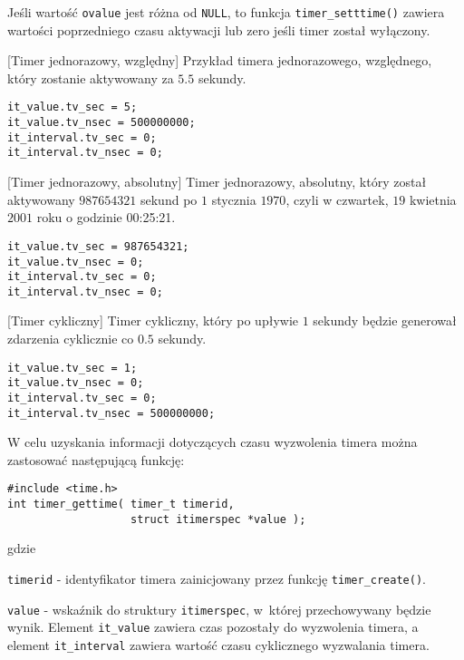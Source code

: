 Jeśli wartość \lstinline[style=MyCStyle]{ovalue} jest różna od \lstinline[style=MyCStyle]{NULL}, to funkcja \lstinline[style=MyCStyle]{timer_setttime()} zawiera wartości poprzedniego czasu aktywacji lub zero jeśli timer został wyłączony. 

\begin{example}{[Timer jednorazowy, względny]}
Przykład timera jednorazowego, względnego, który zostanie aktywowany za $5.5$ sekundy. 
\begin{lstlisting}[style=MyCStyle] 
it_value.tv_sec = 5;
it_value.tv_nsec = 500000000;
it_interval.tv_sec = 0;
it_interval.tv_nsec = 0;
\end{lstlisting}
\end{example}

\begin{example}{[Timer jednorazowy, absolutny]}
Timer jednorazowy, absolutny, który został aktywowany $987654321$ sekund po $1$ stycznia $1970$, czyli w czwartek, $19$ kwietnia $2001$ roku o godzinie 00:25:21.
\begin{lstlisting}[style=MyCStyle] 
it_value.tv_sec = 987654321;
it_value.tv_nsec = 0;
it_interval.tv_sec = 0;
it_interval.tv_nsec = 0;
\end{lstlisting}
\end{example}

\begin{example}{[Timer cykliczny]}
Timer cykliczny, który po upływie $1$ sekundy będzie generował zdarzenia cyklicznie co $0.5$ sekundy. 
\begin{lstlisting}[style=MyCStyle] 
it_value.tv_sec = 1;
it_value.tv_nsec = 0;
it_interval.tv_sec = 0;
it_interval.tv_nsec = 500000000;
\end{lstlisting}
\end{example}

W celu uzyskania informacji dotyczących czasu wyzwolenia timera można zastosować następującą funkcję: 

\begin{lstlisting}[style=MyCStyle] 
#include <time.h>
int timer_gettime( timer_t timerid,
                   struct itimerspec *value );
\end{lstlisting}

\noindent 
gdzie 

\begin{myitemize}
\item[] \lstinline[style=MyCStyle]{timerid} - identyfikator timera zainicjowany przez funkcję \lstinline[style=MyCStyle]{timer_create()}.
\item[] \lstinline[style=MyCStyle]{value} - wskaźnik do struktury \lstinline[style=MyCStyle]{itimerspec}, w~której przechowywany będzie wynik. Element \lstinline[style=MyCStyle]{it_value} zawiera czas pozostały do wyzwolenia timera, a element \lstinline[style=MyCStyle]{it_interval} zawiera wartość czasu cyklicznego wyzwalania timera. 
\end{myitemize}

